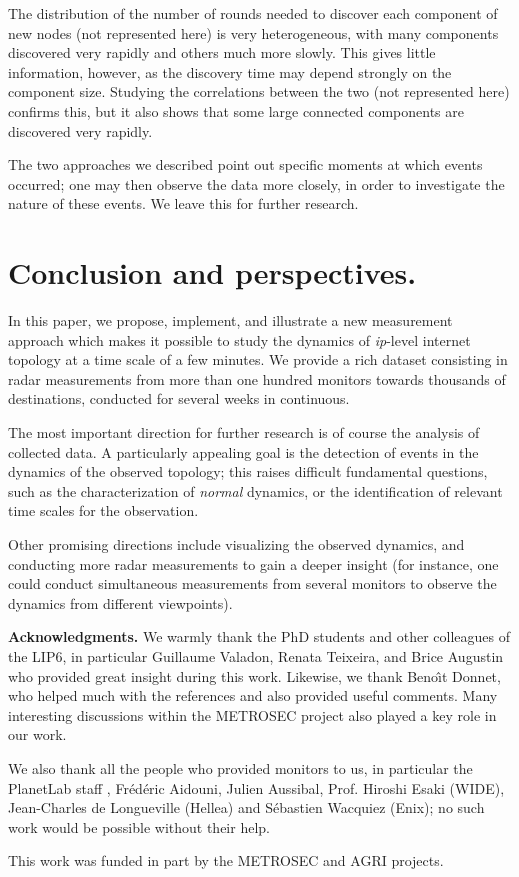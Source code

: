 \documentclass[times, 10pt,twocolumn]{article}
\newcommand{\ip}{\mbox{\em \sc ip}}
\begin{document}
The distribution of the number of rounds needed to discover each component of new nodes (not represented here) is very heterogeneous, with many components discovered very rapidly and others much more slowly. This gives little information, however, as the discovery time may depend strongly on the component size. Studying the correlations between the two (not represented here) confirms this, but it also shows that some large connected components are discovered very rapidly.

\medskip

The two approaches we described point out specific moments at which events occurred;
one may then observe the data more
closely, in order to investigate the nature of these events. We leave
this for further research.


\section{Conclusion and perspectives.}
\label{sec_conclusion}

In this paper, we propose, implement, and illustrate a new measurement
approach which makes it possible to study the dynamics of \ip -level
internet topology at a time scale of a few minutes. We provide a rich
dataset consisting in radar measurements from more than one
hundred monitors towards thousands of destinations, conducted for
several weeks in continuous.

The most important direction for further research is of course the
analysis of collected data.
A particularly appealing goal is the detection of events
in the dynamics of the observed topology;
this raises difficult fundamental questions,
such as the characterization of {\em normal} dynamics,
or the identification of relevant time scales for the observation.

Other promising directions include visualizing the observed
dynamics,
and conducting more radar measurements to gain a deeper insight
(for instance, one could conduct simultaneous
measurements from several monitors to observe the dynamics from
different viewpoints).








\bigskip
\noindent
{\bf Acknowledgments.}
We warmly thank the PhD students and other colleagues of the LIP6, in particular Guillaume Valadon, Renata Teixeira,
and Brice Augustin who provided great insight during this work.
Likewise, we thank Beno\^\i t Donnet, who helped much with the references and also provided useful comments. Many interesting
discussions within the METROSEC project \cite{metrosecurl} also played a key role in our work.

We also thank all the people who provided monitors to us, in particular the PlanetLab staff \cite{planetLab}, Fr\'ed\'eric Aidouni,
Julien Aussibal, Prof. Hiroshi Esaki (WIDE), Jean-Charles de Longueville (Hellea) and S\'ebastien Wacquiez (Enix);
no such work would be possible without their help.

This work was funded in part by the METROSEC and AGRI projects.




\end{document}
